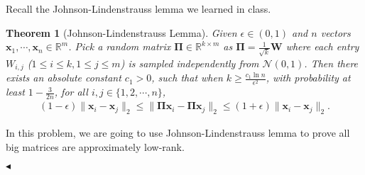 \documentclass[11pt]{article}
\newtheorem{theorem}{Theorem}
\newenvironment{problem}[2][Problem]{\begin{trivlist}
\item[\hskip \labelsep {\bfseries #1}\hskip \labelsep {\bfseries #2.}]}{\hfill$\blacktriangleleft$\end{trivlist}}
\begin{document}
\begin{problem}{3 (26')}
Recall the Johnson-Lindenstrauss lemma we learned in class. 
\begin{theorem}[Johnson-Lindenstrauss Lemma]
    Given $\epsilon\in (0,1)$ and $n$ vectors $\bm x_1 , \cdots , \bm x_n \in \mathbb{R}^m$. Pick a random matrix $\bm \Pi\in\mathbb{R}^{k\times m}$ as $\bm\Pi=\frac{1}{\sqrt{k}}\bm W$ where each entry $W_{i,j}$ ($1\leq i\leq k,1\leq j\leq m$) is sampled independently from $\mathcal{N}(0,1)$. Then there exists an absolute constant $c_1>0$, such that when $k\geq\frac{c_1\ln n}{\epsilon^2}$, with probability at least $1-\frac{3}{2n}$, for all $i,j\in\{1,2,\cdots,n\}$,
    \begin{align*}
        (1-\epsilon)\|\bm x_i-\bm x_j\|_2\leq\|\bm \Pi \bm x_i-\bm \Pi \bm x_j\|_2\leq(1+\epsilon)\|\bm x_i-\bm x_j\|_2.
    \end{align*} 
\end{theorem}

In this problem, we are going to use Johnson-Lindenstrauss lemma to prove all big matrices are approximately low-rank. 


\end{problem}
\end{document}
